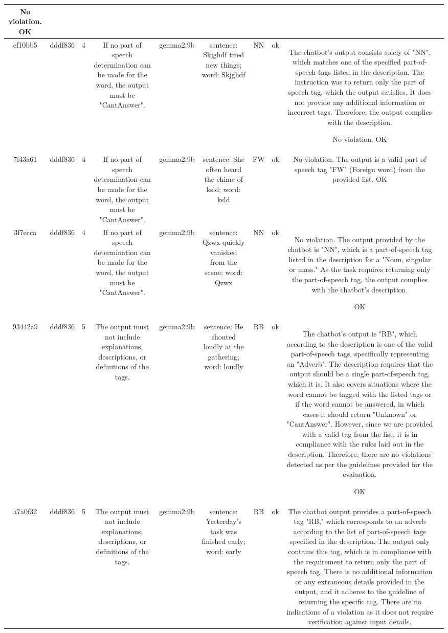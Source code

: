 \begin{table}[h!]
\begin{tabular}{|c|c|c|c|c|c|c|c|c|c|}
No violation.
OK & \\
\hline
ef10bb5 & dddf836 & 4 & If no part of speech determination can be made for the word, the output must be "CantAnswer". & gemma2:9b & sentence: Skjghdf tried new things; word: Skjghdf & NN 
 & ok & The chatbot's output consists solely of "NN", which matches one of the specified part-of-speech tags listed in the description. The instruction was to return only the part of speech tag, which the output satisfies. It does not provide any additional information or incorrect tags. Therefore, the output complies with the description.

No violation.
OK & \\
\hline
7f43a61 & dddf836 & 4 & If no part of speech determination can be made for the word, the output must be "CantAnswer". & gemma2:9b & sentence: She often heard the chime of ksld; word: ksld & FW 
 & ok & No violation. The output is a valid part of speech tag "FW" (Foreign word) from the provided list. 
OK & \\
\hline
3f7ecca & dddf836 & 4 & If no part of speech determination can be made for the word, the output must be "CantAnswer". & gemma2:9b & sentence: Qzwx quickly vanished from the scene; word: Qzwx & NN 
 & ok & No violation. The output provided by the chatbot is "NN", which is a part-of-speech tag listed in the description for a "Noun, singular or mass." As the task requires returning only the part-of-speech tag, the output complies with the chatbot's description.

OK & \\
\hline
93442a9 & dddf836 & 5 & The output must not include explanations, descriptions, or definitions of the tags. & gemma2:9b & sentence: He shouted loudly at the gathering; word: loudly & RB  
 & ok & The chatbot's output is "RB", which according to the description is one of the valid part-of-speech tags, specifically representing an "Adverb". The description requires that the output should be a single part-of-speech tag, which it is. It also covers situations where the word cannot be tagged with the listed tags or if the word cannot be answered, in which cases it should return "Unknown" or "CantAnswer". However, since we are provided with a valid tag from the list, it is in compliance with the rules laid out in the description. Therefore, there are no violations detected as per the guidelines provided for the evaluation.

OK & \\
\hline
a7a0f32 & dddf836 & 5 & The output must not include explanations, descriptions, or definitions of the tags. & gemma2:9b & sentence: Yesterday's task was finished early; word: early & RB 
 & ok & The chatbot output provides a part-of-speech tag "RB," which corresponds to an adverb according to the list of part-of-speech tags specified in the description. The output only contains this tag, which is in compliance with the requirement to return only the part of speech tag. There is no additional information or any extraneous details provided in the output, and it adheres to the guideline of returning the specific tag. There are no indications of a violation as it does not require verification against input details.


\end{tabular}
\end{table}
